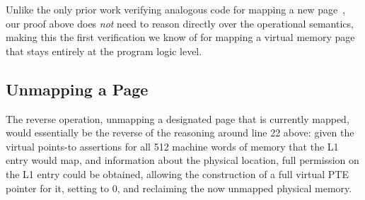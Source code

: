 Unlike the only prior work verifying analogous code for mapping a new page~\cite{kolanski08vstte,kolanski09tphols}, our proof above
does \emph{not} need to reason directly over the operational semantics,
making this the first verification we know of for mapping a virtual memory page that
stays entirely at the program logic level.
\ifPLDI
\else
\subsection{Unmapping a Page}
The reverse operation, unmapping a designated page that is currently mapped,
would essentially be the reverse of
the reasoning around line 22 above: given the virtual points-to assertions for all 512
machine words of memory that the L1 entry would map,
and information about the physical location, 
full permission on the L1 entry could be obtained, allowing the construction of a
full virtual PTE pointer for it, setting to 0, and reclaiming the now unmapped physical memory.
\fi

